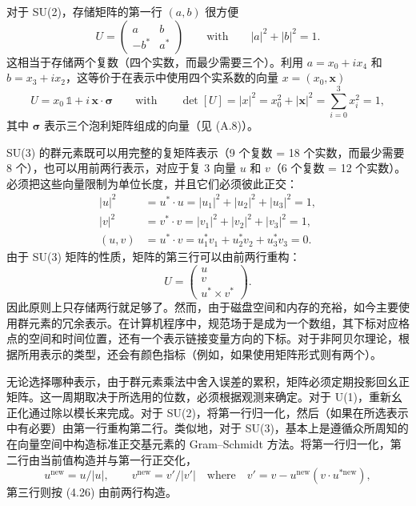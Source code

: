 对于 SU(2)，存储矩阵的第一行 $(a,b)$ 很方便
\begin{equation}
  U = \begin{pmatrix} a & b \\ -b^* & a^* \end{pmatrix}
  \qquad\text{with}\qquad
  |a|^2 + |b|^2 = 1 .
\end{equation}
这相当于存储两个复数（四个实数，而最少需要三个）。利用 $a = x_0 + i x_4$ 和 $b = x_3 + i x_2$，这等价于在表示中使用四个实系数的向量 $x = (x_0, \mathbf{x})$
\begin{equation}
  U = x_0\,\mathbb{1} + i\,\mathbf{x}\cdot\boldsymbol{\sigma}
  \qquad\text{with}\qquad
  \det[U] = |x|^2 = x_0^2 + |\mathbf{x}|^2 = \sum_{i=0}^{3}x_i^2 = 1,
\end{equation}
其中 $\boldsymbol{\sigma}$ 表示三个泡利矩阵组成的向量（见 (A.8)）。

SU(3) 的群元素既可以用完整的复矩阵表示（9 个复数 = 18 个实数，而最少需要 8 个），也可以用前两行表示，对应于复 3 向量 $u$ 和 $v$（6 个复数 = 12 个实数）。必须把这些向量限制为单位长度，并且它们必须彼此正交：
\begin{equation}
  \begin{split}
    |u|^2 &= u^*\cdot u = |u_1|^2 + |u_2|^2 + |u_3|^2 = 1, \\
    |v|^2 &= v^*\cdot v = |v_1|^2 + |v_2|^2 + |v_3|^2 = 1, \\
    (u,v) &= u^*\cdot v = u_1^*v_1 + u_2^*v_2 + u_3^*v_3 = 0 .
  \end{split}
\end{equation}
由于 SU(3) 矩阵的性质，矩阵的第三行可以由前两行重构：
\begin{equation}
  U = \begin{pmatrix} u \\ v \\ u^* \times v^* \end{pmatrix}.
\end{equation}
因此原则上只存储两行就足够了。然而，由于磁盘空间和内存的充裕，如今主要使用群元素的冗余表示。在计算机程序中，规范场于是成为一个数组，其下标对应格点的空间和时间位置，还有一个表示链接变量方向的下标。对于非阿贝尔理论，根据所用表示的类型，还会有颜色指标（例如，如果使用矩阵形式则有两个）。

无论选择哪种表示，由于群元素乘法中舍入误差的累积，矩阵必须定期投影回幺正矩阵。这一周期取决于所选用的位数，必须根据观测来确定。对于 U(1)，重新幺正化通过除以模长来完成。对于 SU(2)，将第一行归一化，然后（如果在所选表示中有必要）由第一行重构第二行。类似地，对于 SU(3)，基本上是遵循众所周知的在向量空间中构造标准正交基元素的 Gram--Schmidt 方法。将第一行归一化，第二行由当前值构造并与第一行正交化，
\begin{equation}
  u^{\mathrm{new}} = u/|u|, \qquad
  v^{\mathrm{new}} = v' / |v'|
  \quad\text{where}\quad
  v' = v - u^{\mathrm{new}}(v\cdot u^{*\mathrm{new}}),
\end{equation}
第三行则按 (4.26) 由前两行构造。

